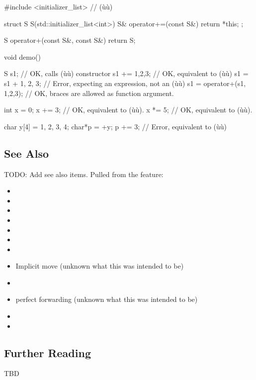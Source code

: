 \begin{emcppslisting}
#include <initializer_list>  // (ù{}ù)

struct S
{
    S(std::initializer_list<int>) { }
    S& operator+=(const S&) { return *this; }
};

S operator+(const S&, const S&) { return S{}; }

void demo()
{
    S s1{};               // OK, calls (ù{}ù) constructor
    s1 += {1,2,3};        // OK, equivalent to (ù{}ù)
    s1 = s1 + {1, 2, 3};  // Error, expecting an expression, not an (ù{}ù)
    s1 = operator+(s1, {1,2,3}); // OK, braces are allowed as function argument.

    int x = 0;
    x += {3};    // OK, equivalent to (ù{}ù).\footnotemark
    x *= {5};    // OK, equivalent to (ù{}ù).\footnotemark

    char y[4] = {1, 2, 3, 4};
    char*p = +y;
    p += {3};    // Error,  equivalent to (ù{}ù)
}
\end{emcppslisting}
    

\subsection[See Also]{See Also}\label{see-also}

TODO: Add see also items. Pulled from the feature:
\begin{itemize}
\item{}
\item{}
\item{}
\item{}
\item{}
\item{}
\item{}
\item{Implicit move (unknown what this was intended to be)}
\item{}
\item{perfect forwarding (unknown what this was intended to be) }
\item{}
\item{}
\end{itemize}

\subsection[Further Reading]{Further Reading}\label{further-reading}

TBD


